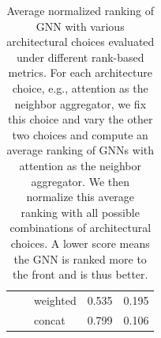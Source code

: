 \documentclass{article}
\begin{document}
\begin{table}[H]
\begin{tabular}{|l|llll|}
                                & \multicolumn{1}{l|}{}                                                                                     & \multicolumn{1}{l|}{weighted}               & 0.535          & 0.195  \\ \cline{3-5} 
                                & \multicolumn{1}{l|}{}                                                                                     & \multicolumn{1}{l|}{concat}                 & 0.799          & 0.106  \\ \hline
\end{tabular}
\caption{Average normalized ranking of GNN with various architectural choices evaluated under different rank-based metrics. For each architecture choice, e.g., attention as the neighbor aggregator, we fix this choice and vary the other two choices and compute an average ranking of GNNs with attention as the neighbor aggregator. We then normalize this average ranking with all possible combinations of architectural choices.  A lower score means the GNN is ranked more to the front and is thus better. }
\label{tab:components-avg-ranking}
\end{table}

\pagebreak

{}

\end{document}
